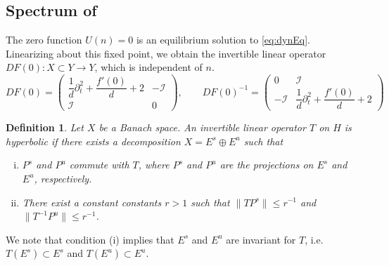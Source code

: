 \documentclass[12pt,reqno]{amsart}
\def\id{{\mathcal I}}
\newtheorem{definition}{Definition}
\begin{document}
\subsection{Spectrum of }

The zero function $U(n) = 0$ is an equilibrium solution to \cref{eq:dynEq}. Linearizing about this fixed point, we obtain the invertible linear operator $DF(0): X \subset Y \rightarrow Y$, which is independent of $n$.
\begin{equation}\label{eq:DF0}
DF(0) = \begin{pmatrix}
\dfrac{1}{d}\partial_t^2 + \dfrac{f'(0)}{d} + 2 & -\id \\ \id & 0
\end{pmatrix}, \qquad
DF(0)^{-1} = \begin{pmatrix}
0 & \id \\ -\id & \dfrac{1}{d}\partial_t^2 + \dfrac{f'(0)}{d} + 2
\end{pmatrix}
\end{equation}

\begin{definition}\label{def:hyp}
Let $X$ be a Banach space. An invertible linear operator $T$ on $H$ is hyperbolic if there exists a decomposition $X = E^s \oplus E^u$ such that 
\begin{enumerate}[(i)]
\item $P^s$ and $P^u$ commute with $T$, where $P^s$ and $P^u$ are the projections on $E^s$ and $E^u$, respectively.
\item There exist a constant constants $r > 1$ such that $\| T P^s \| \leq r^{-1}$ and $\| T^{-1} P^u \| \leq r^{-1}$.
\end{enumerate}
\end{definition}

We note that condition (i) implies that $E^s$ and $E^u$ are invariant for $T$, i.e. $T(E^s) \subset E^s$ and $T(E^u) \subset E^u$.
\end{document}

